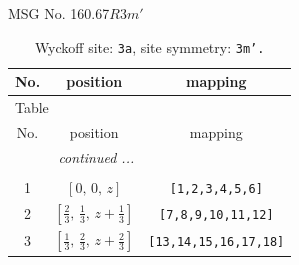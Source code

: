 \documentclass[fleqn,8pt]{jsarticle}
\begin{document}
\setcounter{MaxMatrixCols}{32}

\renewcommand{\tablename}{Table~}
\renewcommand{\figurename}{Figure~}
\begin{center}
\LARGE
MSG No. 160.67\quad$R3m'$
\end{center}
\renewcommand{\arraystretch}{1.2}
\begin{longtable}{ccc}
\caption{Wyckoff site: {\tt 3a}, site symmetry: {\tt 3m'.}}
 \\
 \hline \hline
No. & position & mapping \\ \hline \endfirsthead

\multicolumn{2}{l}{\tablename\ \thetable{}} \\
 \hline \hline
No. & position & mapping \\ \hline \endhead

 \hline \hline
\multicolumn{2}{r}{\footnotesize\it continued ...} \\ \endfoot

 \hline \hline
\multicolumn{2}{r}{} \\ \endlastfoot

1 & $\left[ 0,\, 0,\, z \right]$ & {\tt [1,2,3,4,5,6]} \\ \hline
2 & $\left[ \frac{2}{3},\, \frac{1}{3},\, z + \frac{1}{3} \right]$ & {\tt [7,8,9,10,11,12]} \\ \hline
3 & $\left[ \frac{1}{3},\, \frac{2}{3},\, z + \frac{2}{3} \right]$ & {\tt [13,14,15,16,17,18]} \\
\end{longtable}
\renewcommand{\arraystretch}{1.2}
\end{document}
